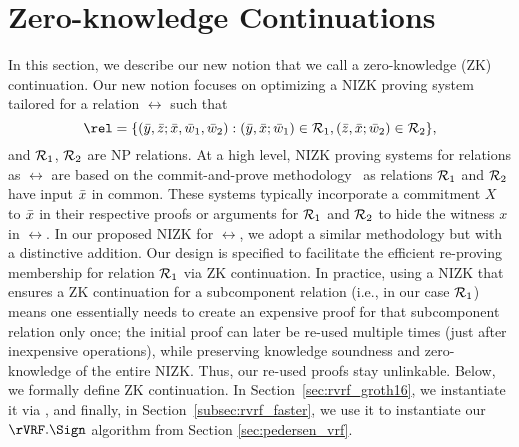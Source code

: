 


\section{Zero-knowledge Continuations}
\label{sec:rvrf_cont}
In this section, we describe our new notion that we call a zero-knowledge (ZK) continuation. Our new notion focuses on optimizing a NIZK proving system tailored for a relation $ \rel $ such that
$$\rel = \{(\bary, \barz; \barx, \baromega_1, \baromega_2):  (\bary, \barx; \baromega_1) \in \relone, (\barz, \barx; \baromega_2) \in \reltwo \},$$
and $\mathcal{R}_1$, $\mathcal{R}_2$ are NP relations. 
At a high level, NIZK proving systems for relations as $ \rel$ are based on the commit-and-prove methodology~\cite{Kilian1990UsesOR,CLOS02,LegoSNARK} 
as relations $\mathcal{R}_1$ and $\mathcal{R}_2$ have input $\bar{x}$ in common. These systems typically incorporate a commitment $X$ to $\bar{x}$ in their respective 
proofs or arguments for $ \mathcal{R}_1 $ and $ \mathcal{R}_2 $ to hide the witness $ x $ in $ \rel $. In our proposed NIZK  for $ \rel $, we adopt a similar methodology but with a distinctive addition. Our design is specified to facilitate the efficient re-proving membership for relation $\mathcal{R}_1$ via ZK continuation. 
In practice, using a NIZK that ensures a ZK continuation for a 
subcomponent relation (i.e., in our case $\mathcal{R}_1$) means one essentially needs to create  an  expensive proof for that subcomponent 
relation only once; the initial proof can later be re-used multiple times (just after inexpensive operations), 
while preserving knowledge soundness and zero-knowledge of the entire NIZK. Thus, our re-used proofs stay unlinkable. 
Below, we formally define ZK continuation. In Section~\ref{sec:rvrf_groth16}, we instantiate it via  \SpecialG, and finally, in Section~\ref{subsec:rvrf_faster}, we use it to instantiate our $ \rVRF.\Sign $ algorithm from Section \ref{sec:pedersen_vrf}. \\




